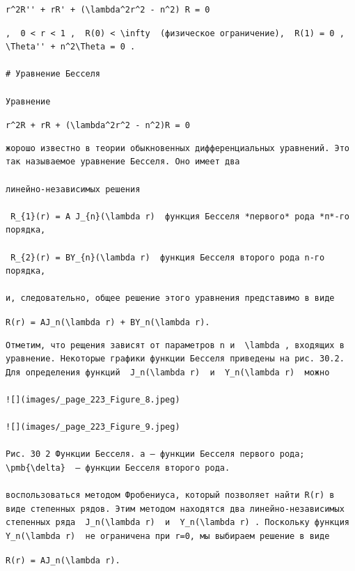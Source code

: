\documentclass[
  ukrainian,
]{article}
\begin{document}
\begin{verbatim}
r^2R'' + rR' + (\lambda^2r^2 - n^2) R = 0
\end{verbatim}

\begin{verbatim}
,  0 < r < 1 ,  R(0) < \infty  (физическое ограничение),  R(1) = 0 ,  \Theta'' + n^2\Theta = 0 .

# Уравнение Бесселя

Уравнение
\end{verbatim}

\texttt{r\^{}2R\textquotesingle{}\textquotesingle{}\ +\ rR\textquotesingle{}\ +\ (\textbackslash{}lambda\^{}2r\^{}2\ -\ n\^{}2)R\ =\ 0}

\begin{verbatim}
жорошо известно в теории обыкновенных дифференциальных уравнений. Это так называемое уравнение Бесселя. Оно имеет два

линейно-независимых решения

 R_{1}(r) = A J_{n}(\lambda r)  функция Бесселя *первого* рода *п*-го порядка,

 R_{2}(r) = BY_{n}(\lambda r)  функция Бесселя второго рода n-го порядка,

и, следовательно, общее решение этого уравнения представимо в виде
\end{verbatim}

\texttt{R(r)\ =\ AJ\_n(\textbackslash{}lambda\ r)\ +\ BY\_n(\textbackslash{}lambda\ r).}

\begin{verbatim}
Отметим, что рещения зависят от параметров n и  \lambda , входящих в уравнение. Некоторые графики функции Бесселя приведены на рис. 30.2. Для определения функций  J_n(\lambda r)  и  Y_n(\lambda r)  можно

![](images/_page_223_Figure_8.jpeg)

![](images/_page_223_Figure_9.jpeg)

Рис. 30 2 Функции Бесселя. a — функции Бесселя первого рода;  \pmb{\delta}  — функции Бесселя второго рода.

воспользоваться методом Фробениуса, который позволяет найти R(r) в виде степенных рядов. Этим методом находятся два линейно-независимых степенных ряда  J_n(\lambda r)  и  Y_n(\lambda r) . Поскольку функция  Y_n(\lambda r)  не ограничена при r=0, мы выбираем решение в виде
\end{verbatim}

\texttt{R(r)\ =\ AJ\_n(\textbackslash{}lambda\ r).}
\end{document}
